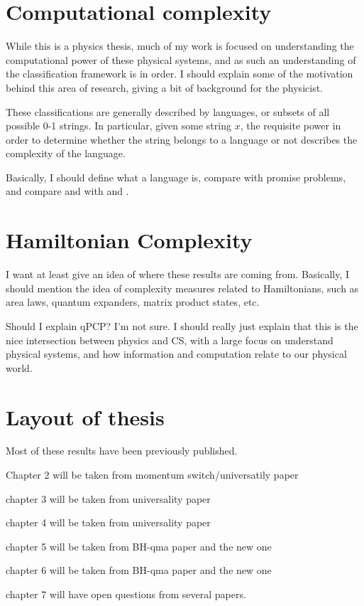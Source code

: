 \documentclass[../thesis-main/thesis-main]{subfiles}
\begin{document}
\section{Computational complexity}

While this is a physics thesis, much of my work is focused on understanding the computational power of these physical systems, and as such an understanding of the classification framework is in order.  I should explain some of the motivation behind this area of research, giving a bit of background for the physicist.

These classifications are generally described by languages, or subsets of all possible 0-1 strings.  In particular, given some string $x$, the requisite power in order to determine whether the string belongs to a language or not describes the complexity of the language.  

Basically, I should define what a language is, compare with promise problems, and compare \PP and \NP  with \BQP  and \QMA .


\section{Hamiltonian Complexity}

I want at least give an idea of where these results are coming from.  Basically, I should mention the idea of complexity measures related to Hamiltonians, such as area laws, quantum expanders, matrix product states, etc.

Should I explain qPCP? I'm not sure.  I should really just explain that this is the nice intersection between physics and CS, with a large focus on understand physical systems, and how information and computation relate to our physical world.





\section{Layout of thesis}

Most of these results have been previously published.

Chapter 2 will be taken from momentum switch/universatily paper

chapter 3 will be taken from universality paper

chapter 4 will be taken from universality paper

chapter 5 will be taken from BH-qma paper and the new one

chapter 6 will be taken from BH-qma paper and the new one

chapter 7 will have open questions from several papers.
\end{document}
